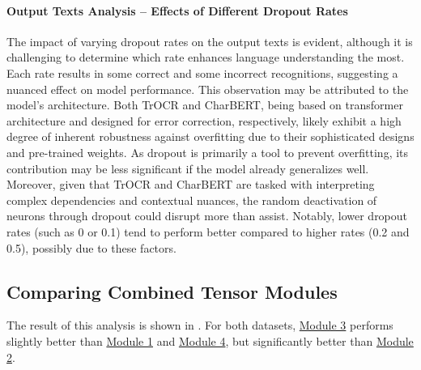 
\paragraph*{Output Texts Analysis -- Effects of Different Dropout Rates}
The impact of varying dropout rates on the output texts is evident, although it is challenging to determine which rate enhances language understanding the most. Each rate results in some correct and some incorrect recognitions, suggesting a nuanced effect on model performance. This observation may be attributed to the model's architecture. Both TrOCR and CharBERT, being based on transformer architecture and designed for error correction, respectively, likely exhibit a high degree of inherent robustness against overfitting due to their sophisticated designs and pre-trained weights. As dropout is primarily a tool to prevent overfitting, its contribution may be less significant if the model already generalizes well. Moreover, given that TrOCR and CharBERT are tasked with interpreting complex dependencies and contextual nuances, the random deactivation of neurons through dropout could disrupt more than assist. Notably, lower dropout rates (such as 0 or 0.1) tend to perform better compared to higher rates (0.2 and 0.5), possibly due to these factors.

\subsection{Comparing Combined Tensor Modules}
\label{subsec:5_comparing_combined_tensor_modules}
The result of this analysis is shown in . For both datasets, \hyperref[subpar:3_linear_layers_as_attention_net]{Module 3} performs slightly better than \hyperref[subpar:3_adding]{Module 1} and \hyperref[subpar:3_convolutional_layers_as_attention_net]{Module 4}, but significantly better than \hyperref[subpar:3_mean_pooling]{Module 2}. 

